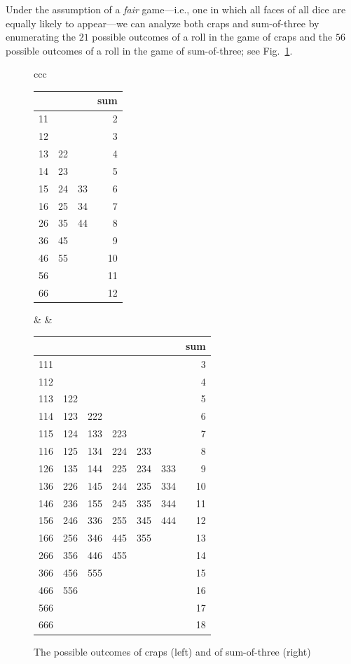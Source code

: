 Under the assumption of a {\em fair} game---i.e., one in which all faces of all dice are equally likely to appear---we can analyze both craps and sum-of-three by enumerating the $21$ possible outcomes of a roll in the game of craps and the $56$ possible outcomes of a roll in the game of sum-of-three; see Fig.~\ref{fig:dice-outcomes}.
\begin{figure}[htb]
\begin{center}
\begin{tabular}{ccc}
\begin{tabular}{|c|c|c|r|}
\hline
   &    &    & sum \\
\hline
11 &    &    & 2 \\
12 &    &    & 3 \\
13 & 22 &    & 4 \\
14 & 23 &    & 5 \\
15 & 24 & 33 & 6 \\
16 & 25 & 34 & 7 \\
26 & 35 & 44 & 8 \\
36 & 45 &    & 9 \\
46 & 55 &    & 10 \\
56 &    &    & 11 \\
66 &    &    & 12 \\
\hline
\end{tabular}
  &
\hspace*{.5in}
  &
\begin{tabular}{|c|c|c|c|c|c|r|}
\hline
 & & & & & & sum\\
\hline
111 & & & & & & 3\\
112 & & & & & & 4\\
113 & 122 & & & & & 5 \\
114 & 123 & 222 & & & & 6 \\
115 & 124 & 133 & 223 & & & 7\\
116 & 125 & 134 &  224 & 233 & & 8\\
126 & 135 & 144 & 225 & 234 & 333 & 9\\
136 & 226 & 145 & 244 & 235 & 334 & 10\\
146 & 236 & 155 & 245 & 335 & 344 & 11\\
156 & 246 & 336 & 255 & 345 & 444 & 12\\
166 & 256 & 346 & 445 & 355 & & 13\\
266 & 356 & 446 & 455 & & & 14\\
366 & 456 & 555 & & & & 15\\
466 & 556 & & & & & 16\\
566 & & & & & & 17\\
666 & & & & & & 18\\
\hline
\end{tabular}
\end{tabular}
\end{center}
\caption{The possible outcomes of craps (left) and of sum-of-three (right)}
\label{fig:dice-outcomes}
\end{figure}

